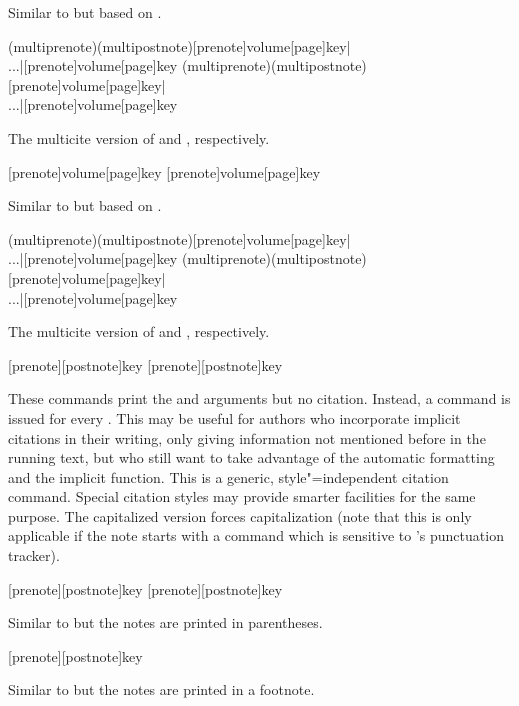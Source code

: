 \documentclass{ltxdockit}[2011/03/25]
\begin{document}
\begin{ltxsyntax}
Similar to  but based on .

(multiprenote)(multipostnote)[prenote]{volume}[page]{key}|\\...|[prenote]{volume}[page]{key}
(multiprenote)(multipostnote)[prenote]{volume}[page]{key}|\\...|[prenote]{volume}[page]{key}

The multicite version of  and , respectively.

[prenote]{volume}[page]{key}
[prenote]{volume}[page]{key}

Similar to  but based on .

(multiprenote)(multipostnote)[prenote]{volume}[page]{key}|\\...|[prenote]{volume}[page]{key}
(multiprenote)(multipostnote)[prenote]{volume}[page]{key}|\\...|[prenote]{volume}[page]{key}

The multicite version of  and , respectively.

[prenote][postnote]{key}
[prenote][postnote]{key}

These commands print the  and  arguments but no citation. Instead, a  command is issued for every . This may be useful for authors who incorporate implicit citations in their writing, only giving information not mentioned before in the running text, but who still want to take advantage of the automatic  formatting and the implicit  function. This is a generic, style"=independent citation command. Special citation styles may provide smarter facilities for the same purpose. The capitalized version forces capitalization (note that this is only applicable if the note starts with a command which is sensitive to 's punctuation tracker).

[prenote][postnote]{key}
[prenote][postnote]{key}

Similar to  but the notes are printed in parentheses.

[prenote][postnote]{key}

Similar to  but the notes are printed in a footnote.

\end{ltxsyntax}
\end{document}
